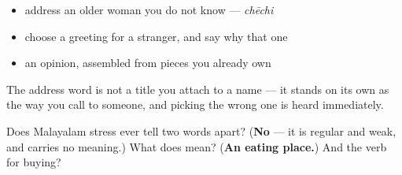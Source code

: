 \begin{itemize}
\raggedright
  \item address an older woman you do not know — \emph{chēchi}
  \item choose a greeting for a stranger, and say why that one
  \item an opinion, assembled from pieces you already own
\end{itemize}

The address word is not a title you attach to a name — it stands on its own as the way you call to someone, and picking the wrong one is heard immediately.

\begin{tcolorbox}[breakable,colback=teal!4,colframe=teal!35!black,title={Before you move on}]
Does Malayalam stress ever tell two words apart? (\textbf{No} — it is regular and weak, and carries no meaning.) What does \textbf{} mean? (\textbf{An eating place.}) And the verb for buying?
\end{tcolorbox}
